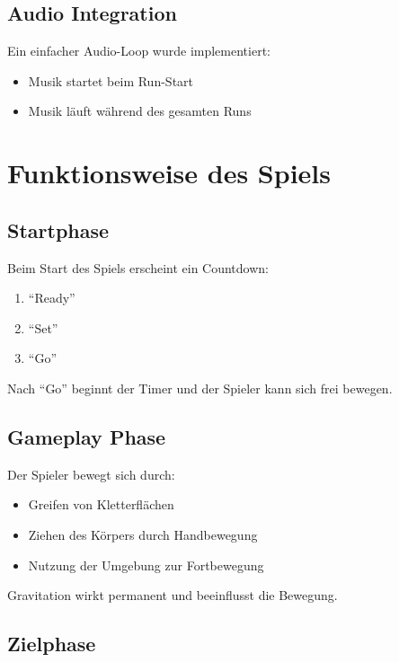\documentclass[11pt,a4paper]{article}
\begin{document}
\subsection{Audio Integration}

Ein einfacher Audio-Loop wurde implementiert:

\begin{itemize}
    \item Musik startet beim Run-Start
    \item Musik läuft während des gesamten Runs
\end{itemize}

\section{Funktionsweise des Spiels}

\subsection{Startphase}

Beim Start des Spiels erscheint ein Countdown:

\begin{enumerate}
    \item ``Ready''
    \item ``Set''
    \item ``Go''
\end{enumerate}

Nach ``Go'' beginnt der Timer und der Spieler kann sich frei bewegen.

\subsection{Gameplay Phase}

Der Spieler bewegt sich durch:

\begin{itemize}
    \item Greifen von Kletterflächen
    \item Ziehen des Körpers durch Handbewegung
    \item Nutzung der Umgebung zur Fortbewegung
\end{itemize}

Gravitation wirkt permanent und beeinflusst die Bewegung.

\subsection{Zielphase}
\end{document}
